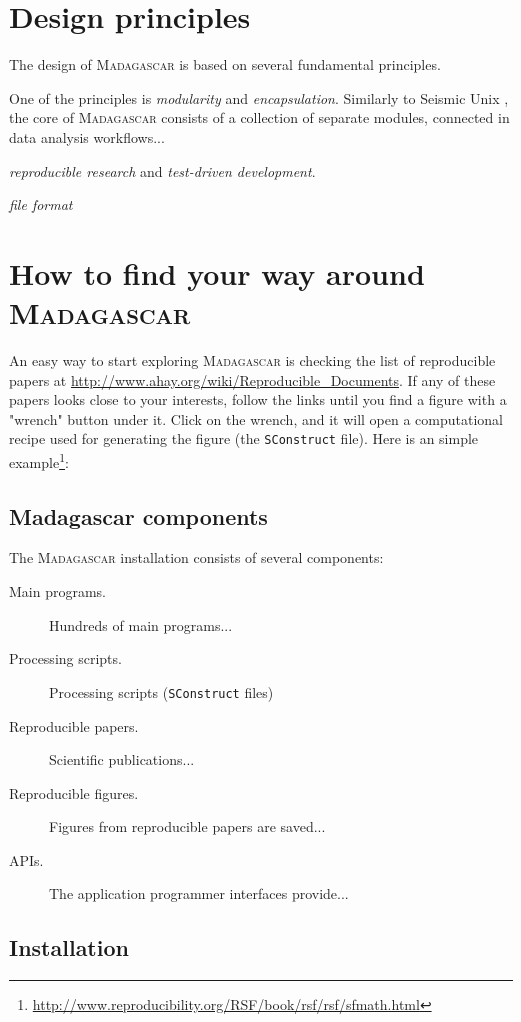 \section{Design principles}

The design of \textsc{Madagascar} is based on several fundamental
principles. 

One of the principles is \emph{modularity} and
\emph{encapsulation}. Similarly to Seismic Unix \cite[]{TLE16-07-10451049},
the core of \textsc{Madagascar} consists of a collection of separate
modules, connected in data analysis workflows...

\emph{reproducible research} and \emph{test-driven development}.

\emph{file format} 

\section{How to find your way around \textsc{Madagascar}}

An easy way to start exploring \textsc{Madagascar} is checking the
list of reproducible papers at
\url{http://www.ahay.org/wiki/Reproducible_Documents}.  If any of
these papers looks close to your interests, follow the links until you
find a figure with a "wrench" button under it. Click on the wrench,
and it will open a computational recipe used for generating the figure
(the \texttt{SConstruct} file). Here is an simple
example\footnote{\url{http://www.reproducibility.org/RSF/book/rsf/rsf/sfmath.html}}:

\subsection{Madagascar components}

The \textsc{Madagascar} installation consists of several components:
\begin{description}
\item[Main programs.] Hundreds of main programs...
\item[Processing scripts.] Processing scripts (\texttt{SConstruct} files)
\item[Reproducible papers.] Scientific publications...
\item[Reproducible figures.] Figures from reproducible papers are saved...
\item[APIs.] The application programmer interfaces provide...  
\end{description}

\subsection{Installation}

